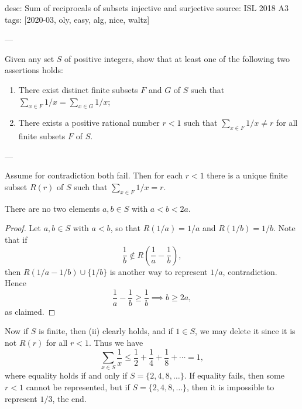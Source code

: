 desc: Sum of reciprocals of subsets injective and surjective
source: ISL 2018 A3
tags: [2020-03, oly, easy, alg, nice, waltz]

---

Given any set $S$ of positive integers, show that at least one of the following two assertions holds:
\begin{enumerate}[label=(\roman*)]
    \item There exist distinct finite subsets $F$ and $G$ of $S$ such that $\sum_{x\in F}1/x=\sum_{x\in G}1/x$;
    \item There exists a positive rational number $r<1$ such that $\sum_{x\in F}1/x\neq r$ for all finite subsets $F$ of $S$.
\end{enumerate}

---

Assume for contradiction both fail. Then for each $r<1$ there is a unique finite subset $R(r)$ of $S$ such that $\textstyle\sum_{x\in F}1/x=r$.
\begin{claim*}
    There are no two elements $a,b\in S$ with $a<b<2a$.
\end{claim*}
\begin{proof}
    Let $a,b\in S$ with $a<b$, so that $R(1/a)=1/a$ and $R(1/b)=1/b$. Note that if \[\frac1b\notin R\left(\frac1a-\frac1b\right),\]
    then $R(1/a-1/b)\cup\{1/b\}$ is another way to represent $1/a$, contradiction. Hence \[\frac1a-\frac1b\ge\frac1b\implies b\ge2a,\]
    as claimed.
\end{proof}

Now if $S$ is finite, then (ii) clearly holds, and if $1\in S$, we may delete it since it is not $R(r)$ for all $r<1$. Thus we have \[\sum_{x\in S}\frac1x\le\frac12+\frac14+\frac18+\cdots=1,\]
where equality holds if and only if $S=\{2,4,8,\ldots\}$. If equality fails, then some $r<1$ cannot be represented, but if $S=\{2,4,8,\ldots\}$, then it is impossible to represent $1/3$, the end.
